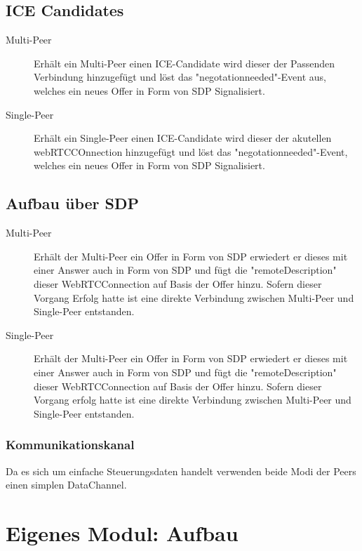 \subsection{ICE Candidates}
\begin{description}
\item[Multi-Peer]
Erhält ein Multi-Peer einen ICE-Candidate wird dieser der Passenden Verbindung 
hinzugefügt und löst das "negotationneeded"-Event aus, welches ein neues Offer 
in Form von SDP Signalisiert.

\item[Single-Peer]
Erhält ein Single-Peer einen ICE-Candidate wird dieser der akutellen 
webRTCCOnnection hinzugefügt und löst das "negotationneeded"-Event, welches ein 
neues Offer in Form von SDP Signalisiert.
\end{description}



\subsection{Aufbau über SDP}
\begin{description}
\item[Multi-Peer]
Erhält der Multi-Peer ein Offer in Form von SDP erwiedert er dieses mit einer 
Answer auch in Form von SDP und fügt die "remoteDescription" dieser 
WebRTCConnection auf Basis der Offer hinzu. Sofern dieser Vorgang Erfolg hatte 
ist eine direkte Verbindung zwischen Multi-Peer und Single-Peer entstanden.

\item[Single-Peer]
Erhält der Multi-Peer ein Offer in Form von SDP erwiedert er dieses mit einer 
Answer auch in Form von SDP und fügt die "remoteDescription" dieser 
WebRTCConnection auf Basis der Offer hinzu. Sofern dieser Vorgang erfolg hatte 
ist eine direkte Verbindung zwischen Multi-Peer und Single-Peer entstanden.
\end{description}



\subsubsection{Kommunikationskanal}
Da es sich um einfache Steuerungsdaten handelt verwenden beide Modi der Peers 
einen simplen DataChannel.



\section{Eigenes Modul: Aufbau}
